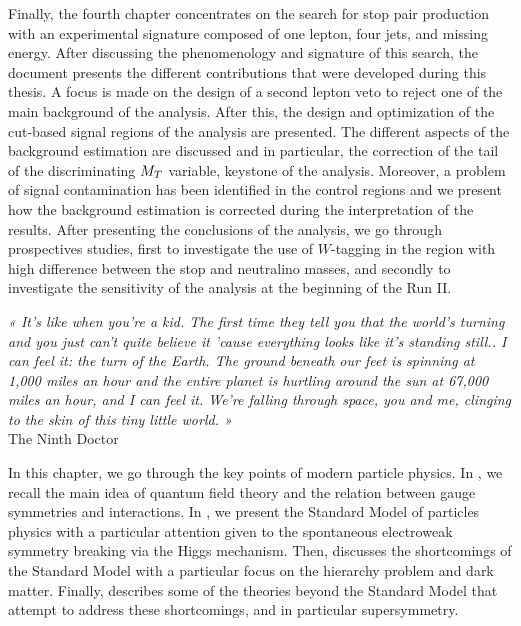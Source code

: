Finally, the fourth chapter concentrates on the search for stop pair production with an
experimental signature composed of one lepton, four jets, and missing energy. After
discussing the phenomenology and signature of this search, the document presents the
different contributions that were developed during this thesis.
A focus is made on the design of a second lepton veto to reject one of the main background
of the analysis. After this, the design and optimization of the cut-based signal regions
of the analysis are presented. The different aspects of the background estimation are
discussed and in particular, the correction of the tail of the discriminating $M_T$
variable, keystone of the analysis. Moreover, a problem of signal contamination has been
identified in the control regions and we present how the background estimation is corrected
during the interpretation of the results. After presenting the conclusions of the analysis,
we go through prospectives studies, first to investigate the use of $W$-tagging in the
region with high difference between the stop and neutralino masses, and secondly to
investigate the sensitivity of the analysis at the beginning of the Run II.

\setcounter{mtc}{2}
\vspace*{-0.7cm}
\begin{center}
\begin{minipage}{0.95\textwidth}
\emph{« It’s like when you’re a kid. The first time they tell you that the world’s turning
and you just can’t quite believe it ’cause everything looks like it’s standing still.. I
can feel it: the turn of the Earth. The ground beneath our feet is spinning at 1,000 miles
an hour and the entire planet is hurtling around the sun at 67,000 miles an hour, and I
can feel it. We’re falling through space, you and me, clinging to the skin of this tiny
little world. »}\\
\hspace*{0.75\textwidth} The Ninth Doctor
\end{minipage}
\end{center}
\minitoc
\newpage

    In this chapter, we go through the key points of modern particle physics. In
    , we recall the main idea of quantum field theory
    and the relation between gauge symmetries and interactions. In ,
    we present the Standard Model of particles physics with a particular attention given
    to the spontaneous electroweak symmetry breaking via the Higgs mechanism. Then,
     discusses the shortcomings of the Standard
    Model with a particular focus on the hierarchy problem and dark matter. Finally,
     describes some of the theories beyond the
    Standard Model that attempt to address these shortcomings, and in particular supersymmetry.

